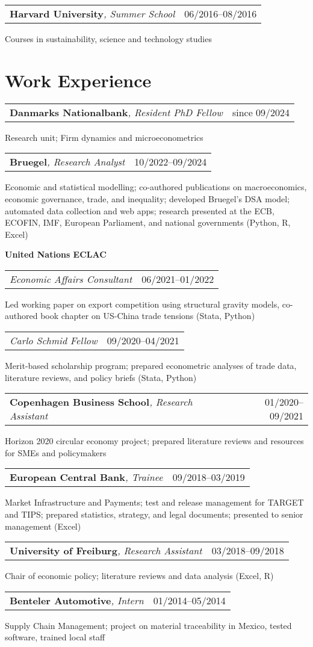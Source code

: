 \documentclass[a4paper,11pt]{article}
\makeatletter
\newcommand{\Subheading}[4]{   
    \vspace{7pt}
    \begin{tabular*}{\textwidth}[t]{@{}l@{\extracolsep{\fill}}r@{}}
        \textbf{#1}\textit{\small #2} & {\footnotesize #3} \\
    \end{tabular*}
    {\small #4}
}
\newcommand{\InstitutionHeading}[1]{%
    \vspace{7pt}
    \textbf{#1}
}
\newcommand{\SubSubheadingA}[3]{   
    \begin{tabular*}{\textwidth}[t]{@{}l@{\extracolsep{\fill}}r@{}}
        \textit{\small #1} & {\footnotesize #2} \\
    \end{tabular*}
    {\small #3}
}
\newcommand{\SubSubheadingB}[3]{   
    \vspace{3pt}
    \begin{tabular*}{\textwidth}[t]{@{}l@{\extracolsep{\fill}}r@{}}
        \textit{\small #1} & {\footnotesize #2} \\
    \end{tabular*}
    {\small #3}
}
\makeatother
\begin{document}
\Subheading
    {Harvard University}{, Summer School}{06/2016--08/2016}
    {Courses in sustainability, science and technology studies}

\section{Work Experience}

\Subheading
    {Danmarks Nationalbank}{, Resident PhD Fellow}{since 09/2024}
    {Research unit; Firm dynamics and microeconometrics}

\Subheading
    {Bruegel}{, Research Analyst}{10/2022--09/2024}
    {Economic and statistical modelling; co-authored publications on macroeconomics, 
    economic governance, trade, and inequality; 
    developed Bruegel's DSA model; 
    automated data collection and web apps;
    research presented at the ECB, ECOFIN, IMF, European Parliament, and national governments 
    (Python, R, Excel)}

\InstitutionHeading{United Nations ECLAC}

    \SubSubheadingA{Economic Affairs Consultant}{06/2021--01/2022}
    {Led working paper on export competition using structural gravity models, 
    co-authored book chapter on US-China trade tensions (Stata, Python)}

    \SubSubheadingB{Carlo Schmid Fellow}{09/2020--04/2021}
    {Merit-based scholarship program; prepared econometric analyses of trade data, 
    literature reviews, and policy briefs (Stata, Python)}

\Subheading
    {Copenhagen Business School}{, Research Assistant}{01/2020--09/2021}
    {Horizon 2020 circular economy project; prepared literature reviews and 
    resources for SMEs and policymakers}

\Subheading
    {European Central Bank}{, Trainee}{09/2018--03/2019}
    {Market Infrastructure and Payments; test and release management for TARGET 
    and TIPS; prepared statistics, strategy, and legal documents;
    presented to senior management (Excel)}

\Subheading
    {University of Freiburg}{, Research Assistant}{03/2018--09/2018}
    {Chair of economic policy; literature reviews and data analysis (Excel, R)}

\Subheading
    {Benteler Automotive}{, Intern}{01/2014--05/2014}
    {Supply Chain Management; project on material traceability in Mexico, 
    tested software, trained local staff}
\end{document}
